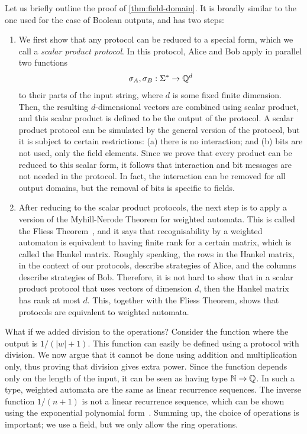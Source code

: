 Let us briefly outline the proof of \cref{thm:field-domain}. It is  broadly similar  to the one used for the case of Boolean outputs, and has  two steps:

\begin{enumerate}
    \item We first show that any protocol can be reduced to a special  form, which we call a \emph{scalar product protocol}. In this protocol, Alice and Bob apply in parallel two functions 
\begin{align*}
\sigma_A, \sigma_B : \Sigma^* \to {\mathbb Q}^d
\end{align*}
to their parts of the input string, where $d$ is some fixed finite dimension. Then, the resulting $d$-dimensional vectors are combined using scalar product, and this scalar product  is defined to be the output of the protocol. A scalar product protocol can be simulated by the general version of the protocol, but it is subject to certain restrictions: (a) there is no interaction; and (b) bits are not used, only the field elements. Since we prove that every product can be reduced to this scalar form, it follows that interaction and bit messages are not needed in the protocol. In fact, the interaction can be removed for all output domains, but the removal of bits is specific to fields. 
\item After reducing to the scalar product protocols, the next step is to apply a version of the Myhill-Nerode Theorem for weighted automata. This is called the  Fliess Theorem~\cite{fliess1974}, and it says that recognisability by a weighted automaton is equivalent to having finite rank for a certain matrix, which is called the Hankel matrix. Roughly speaking, the rows in the Hankel matrix, in the context of our protocols, describe strategies of Alice, and the columns describe strategies of Bob. Therefore, it is not hard to show that in a scalar product protocol that uses vectors of dimension $d$, then the Hankel matrix has rank at most $d$. This, together with the Fliess Theorem, shows that protocols are equivalent to weighted automata. 
\end{enumerate}

 




\begin{myexample}[Division]\label{ex:division} What if we added division to the operations?  Consider the function where the output is $1/(|w|+1)$. This function can easily be defined using a protocol with division. We now argue that it cannot be done using addition and multiplication only, thus proving that division gives extra power. Since the function depends only on the length of the input, it can be seen as having type ${\mathbb N} \to {\mathbb Q}$. In such a type, weighted automata are the same as linear recurrence sequences. The inverse function $1/(n+1)$ is not a  linear recurrence sequence, which can be shown using the exponential polynomial form~\cite[Theorem 2.1]{BerstelReutenauer08}. Summing up, the choice of operations is important; we use a field, but we only allow the ring operations.
\end{myexample}

